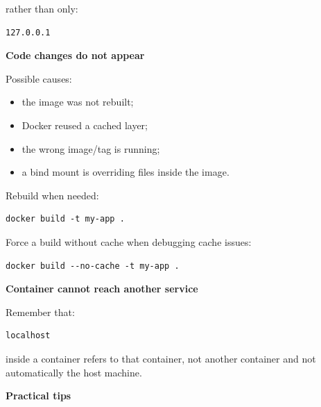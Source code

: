 \documentclass[11pt,letterpaper]{article}
\begin{document}
rather than only:

\begin{lstlisting}
127.0.0.1
\end{lstlisting}

\textbf{Code changes do not appear}

Possible causes:

\begin{itemize}[leftmargin=*]
    \item the image was not rebuilt;
    \item Docker reused a cached layer;
    \item the wrong image/tag is running;
    \item a bind mount is overriding files inside the image.
\end{itemize}

Rebuild when needed:

\begin{lstlisting}
docker build -t my-app .
\end{lstlisting}

Force a build without cache when debugging cache issues:

\begin{lstlisting}
docker build --no-cache -t my-app .
\end{lstlisting}

\textbf{Container cannot reach another service}

Remember that:

\begin{lstlisting}
localhost
\end{lstlisting}

inside a container refers to that container, not another container and not
automatically the host machine.



\textbf{Practical tips}
\end{document}
